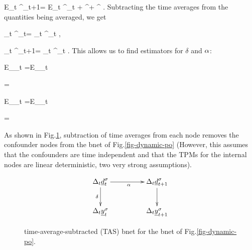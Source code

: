 \beq
E_t \rvd^\s_{t+1}=  \alp E_t \rvd^\s_t +
 \gamma \rvx^\s+ \rvu^\s
\;.
\eeq
Subtracting the time averages from the
quantities being averaged, we get


\beq
\Delta_t \rvy^\s_t=    
\delta\Delta_t  \rvd^\s_t 
\;,
\eeq

\beq
\Delta_t \rvd^\s_{t+1}=  \alp \Delta_t \rvd^\s_t
\;.
\eeq
This allows us to find estimators for $\delta$
and $\alpha$:



\beq
E_\s{}_t
=\delta E_\s{}_t
\eeq

\beq
\delta=
\eeq

\beq
E_\s{}_t
=\alp E_\s{}_t
\eeq

\beq
\alp=
\eeq

As shown in Fig.\ref{fig-dynamic-po-avg},
 subtraction 
of time averages 
from each node removes the 
confounder nodes from the bnet
of Fig.\ref{fig-dynamic-po} (However, this
assumes that the
confounders are time independent
and that the TPMs 
for the internal nodes
are linear deterministic,
two very strong assumptions). 

\begin{figure}[h!]
$$\xymatrix @C=4pc {
\Delta_t\rvd^\s_{t}\ar[d]_\delta\ar[r]_\alp
&\Delta_t\rvd^\s_{t+1}\ar[d]
\\
\Delta_t\rvy^\s_t
&\Delta_t\rvy^\s_{t+1}
}$$
\caption{time-average-subtracted (TAS) bnet for the bnet 
of Fig.\ref{fig-dynamic-po}.
}
\label{fig-dynamic-po-avg}
\end{figure}
